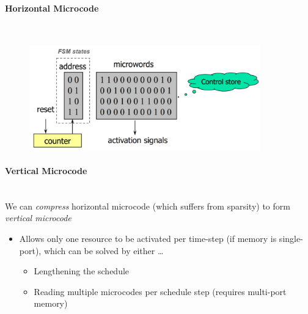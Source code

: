 \documentclass{article}
\begin{document}
\paragraph{Horizontal Microcode}\mbox{}\\
\begin{figure}[htp]
    \centering 
    \includegraphics[width=10cm, scale=1]{S3/horizontalMicrocode.PNG}
\end{figure}

\paragraph{Vertical Microcode}\mbox{}\\
We can \textit{compress} horizontal microcode (which suffers from sparsity) to form \textit{vertical microcode}
\begin{itemize}
    \item Allows only one resource to be activated per time-step (if memory is single-port), which can be solved by either \dots
        \begin{itemize}
            \item Lengthening the schedule
            \item Reading multiple microcodes per schedule step (requires multi-port memory)
        \end{itemize}
\end{itemize}
\end{document}
